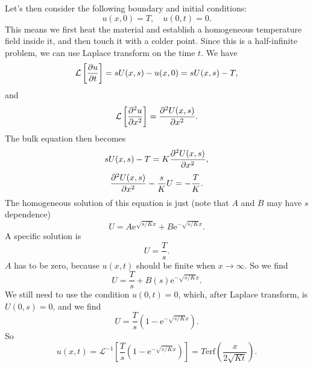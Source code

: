 \documentclass[hyperref, a4paper]{article}
\newcommand*{\ee}{\mathrm{e}}
\newcommand*{\laplace}{\mathcal{L}}
\begin{document}
Let's then consider the following boundary and initial conditions:
\begin{equation}
    u(x, 0) = T, \quad 
    u(0, t) = 0.
\end{equation}
This means we first heat the material 
and establish a homogeneous temperature field inside it, 
and then touch it with a colder point.
Since this is a half-infinite problem, 
we can use Laplace transform on the time $t$.
We have 
\[
    \laplace\left[\pdv{u}{t}\right]
    = s U(x, s) - u(x, 0) = s U(x, s) - T, 
\]
and 
\[
    \laplace\left[\pdv[2]{u}{x}\right] = \pdv[2]{U(x, s)}{x}.
\]
The bulk equation then becomes 
\[
    s U(x, s) - T = K \pdv[2]{U(x, s)}{x}, 
\]
\[
    \pdv[2]{U(x, s)}{x} - \frac{s}{K} U = - \frac{T}{K}.
\]
The homogeneous solution of this equation is just (note that $A$ and $B$ may have $s$ dependence)
\[
    U = A \ee^{\sqrt{s / K} x} + B \ee^{- \sqrt{s / K} x} .
\] 
A specific solution is 
\[
    U = \frac{T}{s}.
\]
$A$ has to be zero, 
because $u(x, t)$ should be finite when $x \to \infty$.
So we find 
\[
    U = \frac{T}{s} + B(s) \ee^{- \sqrt{s / K} x}.
\]
We still need to use the condition $u(0 , t) = 0$, 
which, after Laplace transform, is $U(0, s) = 0$,
and we find 
\[
    U = \frac{T}{s} (1 - \ee^{- \sqrt{s / K} x}).
\]
So 
\begin{equation}
    u(x, t) = \laplace^{-1} \left[
        \frac{T}{s} (1 - \ee^{- \sqrt{s / K} x})
    \right] = T \mathrm{erf} \left(
        \frac{x}{2 \sqrt{Kt}}
    \right).
\end{equation}
\end{document}
